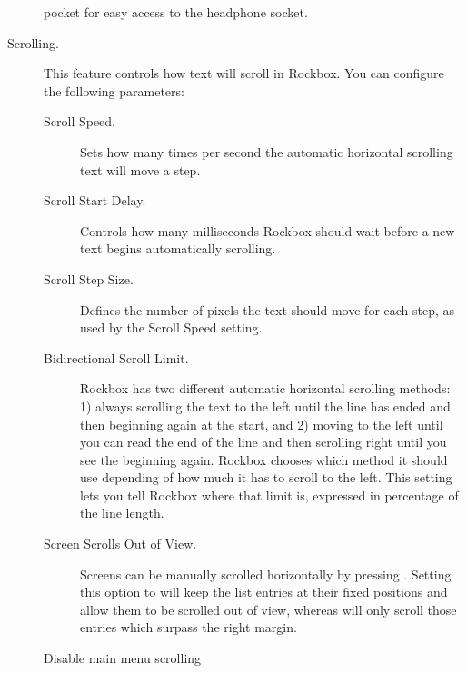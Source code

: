 \begin{description}
{\begin{description}
         pocket for easy access to the headphone socket.
    \end{description}
  }
%
  \item[Scrolling.]
    This feature controls how text will scroll in Rockbox. You can configure
    the following parameters:
    \begin{description}
    \item[Scroll Speed.]
      Sets how many times per second the automatic horizontal scrolling text
      will move a step.
    \item[Scroll Start Delay.]
      Controls how many milliseconds Rockbox should wait before a new
      text begins automatically scrolling.
      \item[Scroll Step Size.]
        Defines the number of pixels the text should move for each step, as used
        by the Scroll Speed setting.
    \item[Bidirectional Scroll Limit.]
      Rockbox has two different automatic horizontal scrolling methods: 1) always
      scrolling the text to the left until the line has ended and then beginning
      again at the start, and 2) moving to the left until you can read the end of
      the line and then scrolling right until you see the beginning again.
      Rockbox chooses which method it should use depending of how much it has to
      scroll to the left. This setting lets you tell Rockbox where that limit
      is, expressed in percentage of the line length.
    \item[Screen Scrolls Out of View.]
      Screens can be manually scrolled horizontally by pressing
      .
      Setting this option to 
      will keep the list entries at their fixed positions and allow them to be
      scrolled out of view, whereas  will only scroll those entries
      which surpass the right margin.
    \item[Disable main menu scrolling]

\end{description}
\end{description}
